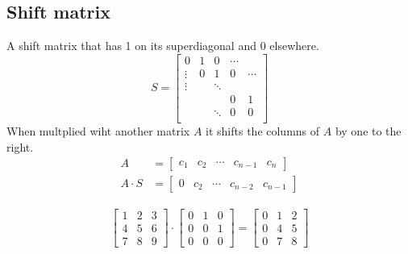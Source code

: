 \subsection{Shift matrix}
A shift matrix that has 1 on its superdiagonal and 0 elsewhere.
\begin{equation*}
    S  = \begin{bmatrix}
        0      & 1 & 0      & \cdots &        \\
        \vdots & 0 & 1      & 0      & \cdots \\
        \vdots &   & \ddots &        &        \\
               &   &        & 0      & 1      \\
               &   & \ddots & 0      & 0      \\
    \end{bmatrix}
\end{equation*}
When multplied wiht another matrix \(A\) it shifts the columns of \(A\) by one to the right.
\begin{align*}
    A         & = \begin{bmatrix}
        c_1 & c_2 & \cdots & c_{n -1} & c_n
    \end{bmatrix} \\
    A \cdot S & = \begin{bmatrix}
        0 & c_2 & \cdots & c_{n -2} & c_{n - 1}
    \end{bmatrix}
\end{align*}
\begin{example}
    \begin{gather*}
        \begin{bmatrix}
            1 & 2 & 3 \\ 4 & 5 & 6 \\ 7 & 8 & 9
        \end{bmatrix} \cdot \begin{bmatrix}
            0 & 1 & 0 \\ 0 & 0 & 1 \\ 0 & 0 & 0
        \end{bmatrix} = \begin{bmatrix}
            0 & 1 & 2 \\ 0 & 4 & 5 \\ 0 & 7 & 8
        \end{bmatrix}
    \end{gather*}
\end{example}
